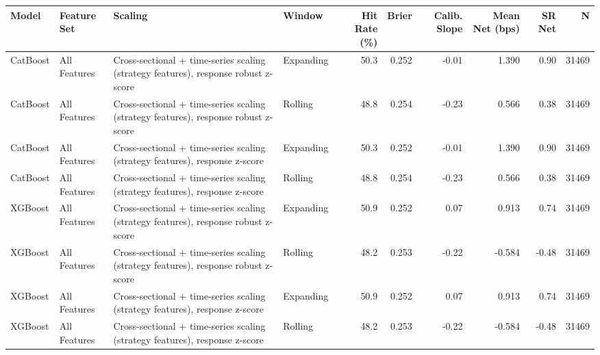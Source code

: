 \begin{tabular}{llllrrrrrr}
\toprule
Model & Feature Set & Scaling & Window & Hit Rate (\%) & Brier & Calib. Slope & Mean Net (bps) & SR Net & N \\
\midrule
CatBoost & All Features & Cross-sectional + time-series scaling (strategy features), response robust z-score & Expanding & 50.3 & 0.252 & -0.01 & 1.390 & 0.90 & 31469 \\
CatBoost & All Features & Cross-sectional + time-series scaling (strategy features), response robust z-score & Rolling & 48.8 & 0.254 & -0.23 & 0.566 & 0.38 & 31469 \\
CatBoost & All Features & Cross-sectional + time-series scaling (strategy features), response z-score & Expanding & 50.3 & 0.252 & -0.01 & 1.390 & 0.90 & 31469 \\
CatBoost & All Features & Cross-sectional + time-series scaling (strategy features), response z-score & Rolling & 48.8 & 0.254 & -0.23 & 0.566 & 0.38 & 31469 \\
XGBoost & All Features & Cross-sectional + time-series scaling (strategy features), response robust z-score & Expanding & 50.9 & 0.252 & 0.07 & 0.913 & 0.74 & 31469 \\
XGBoost & All Features & Cross-sectional + time-series scaling (strategy features), response robust z-score & Rolling & 48.2 & 0.253 & -0.22 & -0.584 & -0.48 & 31469 \\
XGBoost & All Features & Cross-sectional + time-series scaling (strategy features), response z-score & Expanding & 50.9 & 0.252 & 0.07 & 0.913 & 0.74 & 31469 \\
XGBoost & All Features & Cross-sectional + time-series scaling (strategy features), response z-score & Rolling & 48.2 & 0.253 & -0.22 & -0.584 & -0.48 & 31469 \\
\bottomrule
\end{tabular}
